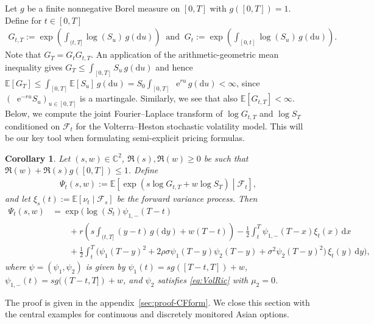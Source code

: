 \documentclass[10pt,a4paper,reqno]{amsart}
\newcommand*{\E}{\mathop{} \mathrm{e}}
\theoremstyle{plain}
\newtheorem{corollary}[theorem]{Corollary}
\theoremstyle{definition}
\theoremstyle{remark}
\theoremstyle{example}
\begin{document}
Let $g$ be a finite nonnegative Borel measure on $[0,T]$ with $g([0,T])=1$. Define for $t \in [0,T]$
\begin{align}\label{eq:Gg}
    G_{t,T} := \exp\left( \int_{(t,T]} \log(S_{u})\, g(\mathrm{d}u) \right) \ \text{ and } \ G_t := \exp\left( \int_{[0,t]} \log(S_u)\, g(\mathrm{d}u) \right).
\end{align}
Note that $G_{T} = G_{t}G_{t,T}$. An application of the arithmetic-geometric mean inequality gives $G_{T} \leq \int_{[0,T]}S_{u}\, g(\mathrm{d}u)$ and hence $\mathbb{E}[ G_{T} ] \leq \int_{[0,T]} \mathbb{E}[S_{u}]\, g(\mathrm{d}u) = S_0 \int_{[0,T]} \E^{ru}\, g(\mathrm{d}u) < \infty$, since $(\E^{-ru}S_u)_{u \in [0,T]}$ is a martingale. Similarly, we see that also $\mathbb{E}[G_{t,T}] < \infty$. Below, we compute the joint Fourier--Laplace transform of $\log G_{t,T}$ and $\log S_T$ conditioned on $\mathcal{F}_{t}$ for the Volterra--Heston stochastic volatility model. This will be our key tool when formulating semi-explicit pricing formulas. 

\begin{corollary}\label{thm:condcfG_nS_Texpression}
Let $(s,w)\in\mathbb{C}^2$, $\Re(s), \Re(w) \geq 0$ be such that $\Re(w) + \Re(s) g([0,T]) \leq 1$. Define
\begin{align}\label{eq:psit}
    \Psi_t(s,w) := \mathbb{E}\left[\exp\left(s\log G_{t,T} + w\log S_T\right)\middle|\mathcal{F}_{t}\right],
\end{align}
 and let $\xi_s(t) := \mathbb{E}[\nu_t\mid\mathcal{F}_s]$ be the forward variance process. Then
\begin{align*}
    \Psi_t(s,w) &= \exp\Bigg( \log(S_t) \psi_{1,-}(T-t)  
        \\ &\qquad + r \left( s \int_{(t,T]} (y-t)\, g(\mathrm{d}y) + w(T-t) \right)
        - \frac{1}{2}\int_t^T \psi_{1,-}(T-x) \xi_t(x)\, \mathrm{d}x
        \\ &\qquad + \tfrac{1}{2}\int_t^T\Big( \psi_1(T-y)^2 + 2\rho\sigma \psi_1(T-y)\psi_2(T-y) + \sigma^2\psi_2(T-y)^2 \Big)\,\xi_t(y)\,\mathrm{d}y \Bigg),
\end{align*}
where $\psi=(\psi_1,\psi_2)$ is given by $\psi_1(t) = s g([T-t, T]) + w$, $\psi_{1,-}(t) = s g((T-t, T]) + w$, and $\psi_2$ satisfies \eqref{eq:VolRic} with $\mu_2 = 0$.
\end{corollary}

The proof is given in the appendix~\ref{sec:proof-CFform}. We close this section with the central examples for continuous and discretely monitored Asian options.
\end{document}
